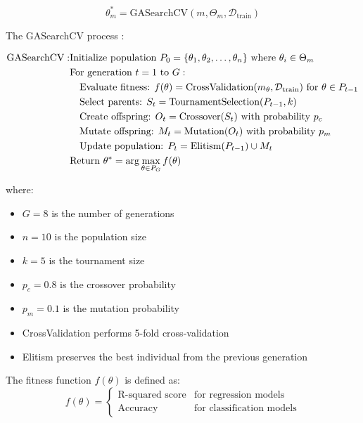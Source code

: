 \documentclass{article}
\begin{document}
\begin{equation}
    \theta_m^* = \text{GASearchCV}(m, \Theta_m, \mathcal{D}_{\text{train}})
\end{equation}

The GASearchCV process
:

\begin{align}
    \text{GASearchCV}: & \space \text{Initialize population } P_0 = \{\theta_1, \theta_2, \dots, \theta_n\} \text{ where } \theta_i \in \Theta_m \\
    & \text{For generation } t = 1 \text{ to } G: \\
    & \quad \text{Evaluate fitness: } f(\theta) = \text{CrossValidation}(m_\theta, \mathcal{D}_{\text{train}}) \text{ for } \theta \in P_{t-1} \\
    & \quad \text{Select parents: } S_t = \text{TournamentSelection}(P_{t-1}, k) \\
    & \quad \text{Create offspring: } O_t = \text{Crossover}(S_t) \text{ with probability } p_c \\
    & \quad \text{Mutate offspring: } M_t = \text{Mutation}(O_t) \text{ with probability } p_m \\
    & \quad \text{Update population: } P_t = \text{Elitism}(P_{t-1}) \cup M_t \\
    & \text{Return } \theta^* = \arg\max_{\theta \in P_G} f(\theta)
\end{align}

where:
\begin{itemize}
    \item $G = 8$ is the number of generations
    \item $n = 10$ is the population size
    \item $k = 5$ is the tournament size
    \item $p_c = 0.8$ is the crossover probability
    \item $p_m = 0.1$ is the mutation probability
    \item CrossValidation performs 5-fold cross-validation
    \item Elitism preserves the best individual from the previous generation
\end{itemize}

The fitness function $f(\theta)$ is defined as:
\begin{equation}
    f(\theta) = \begin{cases}
        \text{R-squared score} & \text{for regression models} \\
        \text{Accuracy} & \text{for classification models}
    \end{cases}
\end{equation}
\end{document}
